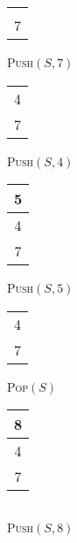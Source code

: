 \documentclass[a4paper,12pt]{article}
\begin{document}
\begin{figure}[H]
	\begin{minipage}{0.133\linewidth}
		\centering
		\begin{tabular}{|c|}
			\hline
			\\ \hline
			\\ \hline
			7 \\ \hline
		\end{tabular}
		\caption*{\textsc{Push}$(S,7)$}
	\end{minipage}
	\begin{minipage}{0.133\linewidth}
		\centering
		\begin{tabular}{|c|}
			\hline
			\\ \hline
			4 \\ \hline
			7 \\ \hline
		\end{tabular}
		\caption*{\textsc{Push}$(S,4)$}
	\end{minipage}
	\begin{minipage}{0.133\linewidth}
		\centering
		\begin{tabular}{|c|}
			\hline
			5 \\ \hline
			4 \\ \hline
			7 \\ \hline
		\end{tabular}
		\caption*{\textsc{Push}$(S,5)$}
	\end{minipage}
	\begin{minipage}{0.133\linewidth}
		\centering
		\begin{tabular}{|c|}
			\hline
			\\ \hline
			4 \\ \hline
			7 \\ \hline
		\end{tabular}
		\caption*{\textsc{Pop}$(S)$}
	\end{minipage}
	\begin{minipage}{0.133\linewidth}
		\centering
		\begin{tabular}{|c|}
			\hline
			8 \\ \hline
			4 \\ \hline
			7 \\ \hline
		\end{tabular}
		\caption*{\textsc{Push}$(S,8)$}
	\end{minipage}
	\begin{minipage}{0.133\linewidth}
		\centering
		\begin{tabular}{|c|}
			\hline
			\\ \hline

\end{tabular}
\end{minipage}
\end{figure}
\end{document}

